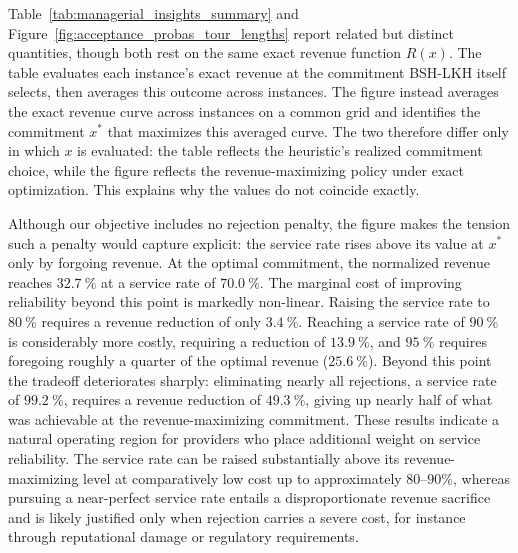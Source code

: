 \documentclass[11pt]{article}
\theoremstyle{plain}
\theoremstyle{definition}
\newcommand{\lnote}[1]{{\color{blue}[{\tiny \textbf{Lina:} \bf #1}]\marginpar{\color{blue}*}}}
\newcommand{\lnote}[1]{}
\begin{document}
 Table~\ref{tab:managerial_insights_summary} and Figure~\ref{fig:acceptance_probas_tour_lengths}
 report related but distinct quantities, though both rest on the same exact revenue function
 $R(x)$. The table evaluates each instance's exact revenue at the commitment BSH-\ac{LKH}
 itself selects, then averages this outcome across instances. The figure instead averages
 the exact revenue curve across instances on a common grid and identifies the commitment
 $x^*$ that maximizes this averaged curve. The two therefore differ only in which $x$ is
 evaluated: the table reflects the heuristic's realized commitment choice, while the figure
 reflects the revenue-maximizing policy under exact optimization. This explains why the
 values do not coincide exactly.
 
 Although our objective includes no rejection penalty, the figure makes the tension such a
 penalty would capture explicit: the service rate rises above its value at $x^*$
 only by forgoing revenue. At the optimal commitment, the normalized revenue reaches
 $32.7~\%$ at a service rate of $70.0~\%$. The marginal cost of improving reliability beyond this point is markedly
 non-linear. Raising the service rate to $80~\%$ requires a revenue reduction of only
 $3.4~\%$. Reaching a service rate of $90~\%$ is considerably more costly, requiring a reduction
 of $13.9~\%$, and $95~\%$ requires foregoing roughly a quarter of the optimal
 revenue ($25.6~\%$). Beyond this point the tradeoff deteriorates sharply: eliminating
 nearly all rejections, a service rate of $99.2~\%$, requires a revenue reduction of
 $49.3~\%$, giving up nearly half of what was achievable at the revenue-maximizing commitment. These results indicate a natural operating
 region for providers who place additional weight on service reliability. The service rate can
 be raised substantially above its revenue-maximizing level at comparatively low cost up
 to approximately $80$--$90\%$, whereas pursuing a near-perfect service rate entails a
 disproportionate revenue sacrifice and is likely justified only when rejection carries a
 severe cost, for instance through reputational damage or regulatory requirements.
 
\end{document}
